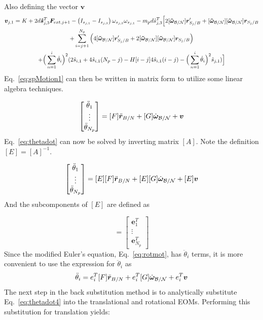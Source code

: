 Also defining the vector $\bm v$ 
\begin{multline}
	\bm v_{j,1} =  K + 2d\bm{\hat{s}}^{T}_{j,3}\bm F_{ext,j+1} - \left( I_{s_{j,1}} - I_{s_{j,3}}\right) \omega_{s_{j,3}} \omega_{s_{j,1}} - m_p d \hat{s}^{T}_{j,3}\Big[2[\bm{\tilde{\omega}}_{\cal B/N}]\bm r'_{S_{j}/B} + [\bm{\tilde{\omega}}_{\cal B/N}][\bm{\tilde{\omega}}_{\cal B/N}]\bm r_{S_{j}/B}\\
	+\sum^{N_p}_{i=j+1}\Big(4[\bm{\tilde{\omega}}_{\cal B/N}]\bm r'_{S_{j}/B} + 2[\bm{\tilde{\omega}}_{\cal B/N}][\bm{\tilde{\omega}}_{\cal B/N}]\bm r_{S_{j}/B} \Big) \\
	+ \Big( \sum^{i}_{n=1} \dot{\theta}_i \Big)^2 (2\hat{s}_{i,1}+4\hat{s}_{i,1}(N_p-j) -H[i-j] 4\hat{s}_{i,1}(i-j) - \Big( \sum^{i}_{n=1} \dot{\theta}_i\Big)^2 \hat{s}_{j,1} )\Big]
\end{multline}
Eq.~\eqref{eq:spMotion1} can then be written in matrix form to utilize some linear algebra techniques.

\begin{equation}
	[A]\begin{bmatrix}
		\ddot \theta_{1}\\
		\vdots \\
		\ddot \theta_{N_p}
	\end{bmatrix}
	= [F] \ddot{\bm r}_{B/N} + [G]\dot{\bm\omega}_{\cal B/N} + \bm v
	\label{eq:thetadot}
\end{equation}
Eq.~\eqref{eq:thetadot} can now be solved by inverting matrix $[A]$. Note the definition $[E] = [A]^{-1}$.

\begin{equation}
	\begin{bmatrix}
		\ddot \theta_{1}\\
		\vdots \\
		\ddot \theta_{N_p}
	\end{bmatrix}
	= [E][F] \ddot{\bm r}_{B/N} + [E][G]\dot{\bm\omega}_{\cal B/N} + [E]\bm v
	\label{eq:thetadot2}
\end{equation}
And the subcomponents of $[E]$ are defined as

\begin{equation}
	[E] = \begin{bmatrix}
		\bm e_{1}^T\\
		\vdots \\
		\bm e_{N_p}^T
	\end{bmatrix}
	\label{eq:E}
\end{equation}
Since the modified Euler's equation, Eq.~\eqref{eq:rotmot}, has $\ddot \theta_{i}$ terms, it is more convenient to use the expression for $\ddot \theta_i$ as
\begin{equation}
	\ddot \theta_{i}
	= e_{i}^T[F] \ddot{\bm r}_{B/N} + e_{i}^T[G]\dot{\bm\omega}_{\cal B/N} + e_{i}^T\bm v
	\label{eq:thetadot4}
\end{equation}
The next step in the back substitution method is to analytically substitute Eq.~\eqref{eq:thetadot4} into the translational and rotational EOMs. Performing this substitution for translation yields:

